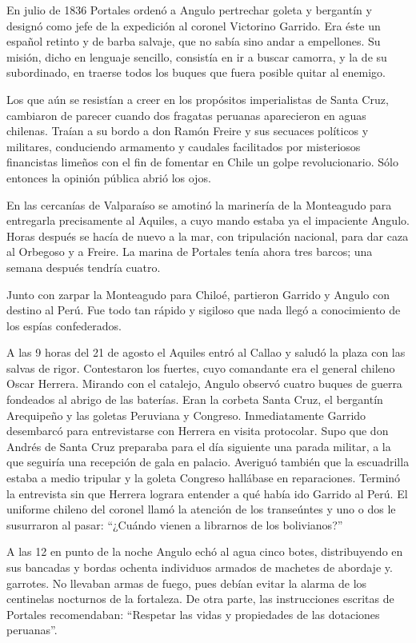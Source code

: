 \documentclass[10pt,twoside,openright]{memoir}
\begin{document}
En julio de 1836 Portales ordenó a Angulo pertrechar goleta y bergantín
y designó como jefe de la expedición al coronel Victorino Garrido. Era
éste un español retinto y de barba salvaje, que no sabía sino andar a
empellones. Su misión, dicho en lenguaje sencillo, consistía en ir a
buscar camorra, y la de su subordinado, en traerse todos los buques que
fuera posible quitar al enemigo.

Los que aún se resistían a creer en los propósitos imperialistas de
Santa Cruz, cambiaron de parecer cuando dos fragatas peruanas
aparecieron en aguas chilenas. Traían a su bordo a don Ramón Freire y
sus secuaces políticos y militares, conduciendo armamento y caudales
facilitados por misteriosos financistas limeños con el fin de fomentar
en Chile un golpe revolucionario. Sólo entonces la opinión pública abrió
los ojos.

En las cercanías de Valparaíso se amotinó la marinería de la Monteagudo
para entregarla precisamente al Aquiles, a cuyo mando estaba ya el
impaciente Angulo. Horas después se hacía de nuevo a la mar, con
tripulación nacional, para dar caza al Orbegoso y a Freire. La marina de
Portales tenía ahora tres barcos; una semana después tendría cuatro.

Junto con zarpar la Monteagudo para Chiloé, partieron Garrido y Angulo
con destino al Perú. Fue todo tan rápido y sigiloso que nada llegó a
conocimiento de los espías confederados.

A las 9 horas del 21 de agosto el Aquiles entró al Callao y saludó la
plaza con las salvas de rigor. Contestaron los fuertes, cuyo comandante
era el general chileno Oscar Herrera. Mirando con el catalejo, Angulo
observó cuatro buques de guerra fondeados al abrigo de las baterías.
Eran la corbeta Santa Cruz, el bergantín Arequipeño y las goletas
Peruviana y Congreso. Inmediatamente Garrido desembarcó para
entrevistarse con Herrera en visita protocolar. Supo que don Andrés de
Santa Cruz preparaba para el día siguiente una parada militar, a la que
seguiría una recepción de gala en palacio. Averiguó también que la
escuadrilla estaba a medio tripular y la goleta Congreso hallábase en
reparaciones. Terminó la entrevista sin que Herrera lograra entender a
qué había ido Garrido al Perú. El uniforme chileno del coronel llamó la
atención de los transeúntes y uno o dos le susurraron al pasar: ``¿Cuándo
vienen a librarnos de los bolivianos?''

A las 12 en punto de la noche Angulo echó al agua cinco botes,
distribuyendo en sus bancadas y bordas ochenta individuos armados de
machetes de abordaje y. garrotes. No llevaban armas de fuego, pues
debían evitar la alarma de los centinelas nocturnos de la fortaleza. De
otra parte, las instrucciones escritas de Portales recomendaban:
``Respetar las vidas y propiedades de las dotaciones peruanas''.
\end{document}
